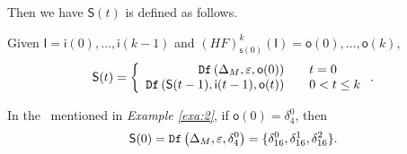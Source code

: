  Then we have $\mathsf{S}(t)$ is defined as follows. 
 \begin{definition}[$\mathsf{S}(t)$] Given $\mathsf{I}=\mathsf{i}(0),\ldots,\mathsf{i}(k-1)$ and $(HF)^k_{\mathsf{s}(0)}(\mathsf{I})=\mathsf{o}(0),\ldots,\mathsf{o}(k)$, %
	\[\mathsf{S}(t)=\left\{
\begin{array}{rcl}
{\tt Df}\left(\Delta_M,\varepsilon,\mathsf{o}(0)\right)      &      & {t=0}\\
{\tt Df}\left(\mathsf{S}(t-1),\mathsf{i}(t-1),\mathsf{o}(t)\right)       &      & 0<t\leq k
\end{array} \right. .\]

\end{definition}
\begin{example}
In the \BCN\ mentioned in {\em Example \ref{exa:2}}, if $\mathsf{o}(0)=\delta_4^0$, then \[\mathsf{S}(0)={\tt Df}\left(\Delta_M,\varepsilon,\delta_4^0\right)=\{\delta_{16}^0,\delta_{16}^1,\delta_{16}^2\}.\]
 \label{exa:8}
 \end{example}   
 

 
 

